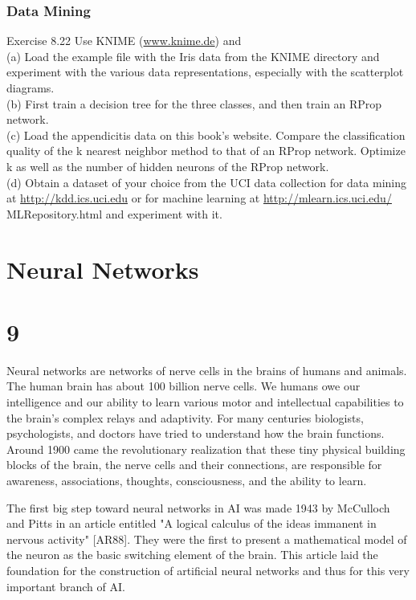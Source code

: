 \documentclass[10pt]{article}
\begin{document}
\subsubsection*{Data Mining}
Exercise 8.22 Use KNIME (\href{http://www.knime.de}{www.knime.de}) and\\
(a) Load the example file with the Iris data from the KNIME directory and experiment with the various data representations, especially with the scatterplot diagrams.\\
(b) First train a decision tree for the three classes, and then train an RProp network.\\
(c) Load the appendicitis data on this book's website. Compare the classification quality of the k nearest neighbor method to that of an RProp network. Optimize k as well as the number of hidden neurons of the RProp network.\\
(d) Obtain a dataset of your choice from the UCI data collection for data mining at \href{http://kdd.ics.uci.edu}{http://kdd.ics.uci.edu} or for machine learning at \href{http://mlearn.ics.uci.edu/}{http://mlearn.ics.uci.edu/} MLRepository.html and experiment with it.

\section*{Neural Networks}
\section*{9}
Neural networks are networks of nerve cells in the brains of humans and animals. The human brain has about 100 billion nerve cells. We humans owe our intelligence and our ability to learn various motor and intellectual capabilities to the brain's complex relays and adaptivity. For many centuries biologists, psychologists, and doctors have tried to understand how the brain functions. Around 1900 came the revolutionary realization that these tiny physical building blocks of the brain, the nerve cells and their connections, are responsible for awareness, associations, thoughts, consciousness, and the ability to learn.

The first big step toward neural networks in AI was made 1943 by McCulloch and Pitts in an article entitled "A logical calculus of the ideas immanent in nervous activity" [AR88]. They were the first to present a mathematical model of the neuron as the basic switching element of the brain. This article laid the foundation for the construction of artificial neural networks and thus for this very important branch of AI.
\end{document}
